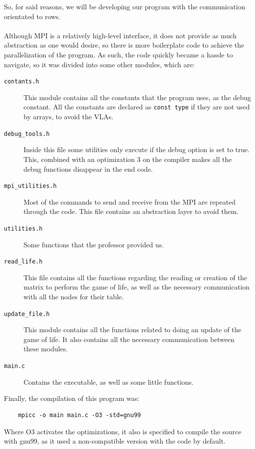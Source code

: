 \documentclass[11pt, a4paper]{article}
\begin{document}
So, for said reasons, we will be developing our program with the communication orientated to rows.\\
\\
Although MPI is a relatively high-level interface, it does not provide as much abstraction as one would desire, so there is more boilerplate code to achieve the parallelization of the program. As such, the code quickly became a hassle to navigate, so it was divided into some other modules, which are:
\begin{description}
	\item[\texttt{contants.h}] This module contains all the constants that the program uses, as the debug constant. All the constants are declared as \texttt{const type} if they are not used by arrays, to avoid the VLAs.
	
	\item[\texttt{debug\_tools.h}] Inside this file some utilities only execute if the debug option is set to true. This, combined with an optimization 3 on the compiler makes all the debug functions disappear in the end code.
	
	\item[\texttt{mpi\_utilities.h}] Most of the commands to send and receive from the MPI are repeated through the code. This file contains an abstraction layer to avoid them.
	
	\item[\texttt{utilities.h}] Some functions that the professor provided us.
	
	\item[\texttt{read\_life.h}] This file contains all the functions regarding the reading or creation of the matrix to perform the game of life, as well as the necessary communication with all the nodes for their table.
	
	\item[\texttt{update\_file.h}] This module contains all the functions related to doing an update of the game of life. It also contains all the necessary communication between these modules.
	
	\item[\texttt{main.c}] Contains the executable, as well as some little functions.
\end{description} 
\vspace{0.75cm}

Finally, the compilation of this program was:
\begin{verbatim}
	mpicc -o main main.c -O3 -std=gnu99
\end{verbatim}
Where O3 activates the optimizations, it also is specified to compile the source with gnu99, as it used a non-compatible version with the code by default.
\end{document}
